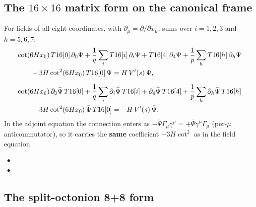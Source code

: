 \subsection{The \texorpdfstring{$16\times16$}{16x16} matrix form on the canonical frame}
\label{sec:5.2}

For fields of all eight coordinates, with $\partial_\mu=\partial/\partial x_\mu$, sums over $i=1,2,3$
and $h=5,6,7$:
\begin{align*}
  &\cot(6Hx_0)\,T16[0]\,\partial_0\Psi+\frac1q\sum_iT16[i]\,\partial_i\Psi+T16[4]\,\partial_4\Psi
  +\frac1p\sum_hT16[h]\,\partial_h\Psi\\
  &\qquad-3H\cot^2(6Hx_0)\,T16[0]\,\Psi=H\,V'(s)\,\Psi,\\[6pt]
  &\cot(6Hx_0)\,\partial_0\bar\Psi\,T16[0]+\frac1q\sum_i\partial_i\bar\Psi\,T16[i]+\partial_4\bar\Psi\,T16[4]
  +\frac1p\sum_h\partial_h\bar\Psi\,T16[h]\\
  &\qquad-3H\cot^2(6Hx_0)\,\bar\Psi\,T16[0]=-H\,V'(s)\,\bar\Psi .
\end{align*}
In the adjoint equation the connection enters as
$-\bar\Psi\Gamma_\mu\gamma^\mu=+\bar\Psi\gamma^\mu\Gamma_\mu$ (per-$\mu$ anticommutator), so it carries
the \textbf{same} coefficient $-3H\cot^2$ as in the field equation. 
\begin{itemize}
  \item {}
  \item {}
\end{itemize}

\subsection{The split-octonion 8+8 form}
\label{sec:5.3}

